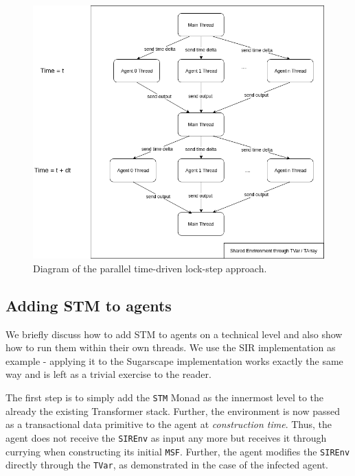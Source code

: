 \begin{figure}
	\centering
	\includegraphics[width=1.0\textwidth, angle=0]{./fig/concurrentabs/stm_abs.png}
	\caption[Diagram of the parallel time-driven lock-step approach]{Diagram of the parallel time-driven lock-step approach.}
	\label{fig:stm_abs_structure}
\end{figure}

\subsection{Adding STM to agents}
We briefly discuss how to add STM to agents on a technical level and also show how to run them within their own threads. We use the SIR implementation as example - applying it to the Sugarscape implementation works exactly the same way and is left as a trivial exercise to the reader.

The first step is to simply add the \texttt{STM} Monad as the innermost level to the already the existing Transformer stack. Further, the environment is now passed as a transactional data primitive to the agent at \textit{construction time}. Thus, the agent does not receive the \texttt{SIREnv} as input any more but receives it through currying when constructing its initial \texttt{MSF}. Further, the agent modifies the \texttt{SIREnv} directly through the \texttt{TVar}, as demonstrated in the case of the infected agent.

